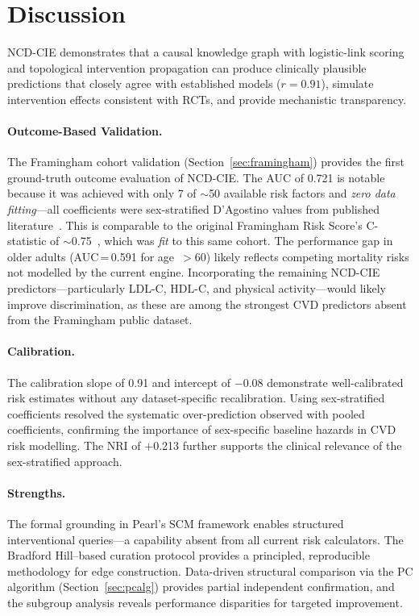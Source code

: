 \documentclass[runningheads]{llncs}
\begin{document}
\section{Discussion}\label{sec:discussion}

NCD-CIE demonstrates that a causal knowledge graph with logistic-link
scoring and topological intervention propagation can produce
clinically plausible predictions that closely agree with established
models ($r = 0.91$), simulate intervention effects consistent with
RCTs, and provide mechanistic transparency.

\paragraph{Outcome-Based Validation.}
The Framingham cohort validation (Section~\ref{sec:framingham})
provides the first ground-truth outcome evaluation of NCD-CIE.
The AUC of 0.721 is notable because it was achieved with only 7 of
${\sim}$50 available risk factors and \emph{zero data fitting}---all
coefficients were sex-stratified D'Agostino values from published
literature~\cite{dagostino2008}.  This is comparable to the original
Framingham Risk Score's C-statistic of
${\sim}$0.75~\cite{dagostino2008framingham}, which was \emph{fit} to
this same cohort.  The performance gap in older adults
(AUC\,=\,0.591 for age~${>}$60) likely reflects competing mortality
risks not modelled by the current engine.  Incorporating the remaining
NCD-CIE predictors---particularly LDL-C, HDL-C, and physical
activity---would likely improve discrimination, as these are among the
strongest CVD predictors absent from the Framingham public dataset.

\paragraph{Calibration.}
The calibration slope of 0.91 and intercept of $-$0.08 demonstrate
well-calibrated risk estimates without any dataset-specific
recalibration.  Using sex-stratified coefficients resolved the
systematic over-prediction observed with pooled coefficients,
confirming the importance of sex-specific baseline hazards in CVD
risk modelling.  The NRI of $+$0.213 further supports the clinical
relevance of the sex-stratified approach.

\paragraph{Strengths.}
The formal grounding in Pearl's SCM framework enables structured
interventional queries---a capability absent from all current risk
calculators.  The Bradford Hill--based curation
protocol provides a principled, reproducible methodology for edge
construction.  Data-driven structural comparison via the PC algorithm
(Section~\ref{sec:pcalg}) provides partial independent confirmation,
and the subgroup analysis reveals performance
disparities for targeted improvement.
\end{document}
